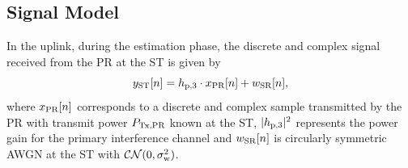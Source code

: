 
\subsection{Signal Model}
In the uplink, during the estimation phase, the discrete and complex signal received from the PR at the ST is given by
\begin{equation}
y_{\text{ST}}[n] = h_{\text{p,3}} \cdot x_{\text{PR}}[n] + w_{\text{SR}}[n],
\label{eq_US:sys_mod_st}
\end{equation}
where $x_{\text{PR}}[n]$ corresponds to a discrete and complex sample transmitted by the PR with transmit power $P_{\text{Tx,PR}}$ known at the ST, $|h_{\text{p,3}}|^2$ represents the power gain for the primary interference channel and $w_{\text{SR}}[n]$ is circularly symmetric AWGN at the ST with %
$\mathcal{CN}(0, \sigma^2_{\text{w}})$. %

